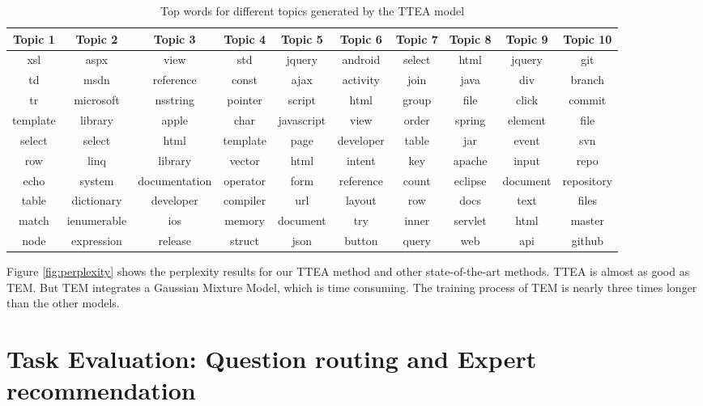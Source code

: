 {{{{{{{\begin{sidewaystable}
\caption{Top words for different topics generated by the TTEA model}
\label{tab:topwordsp}
\centering
\begin{tabular}{cccccccccc}
\hline
Topic 1& Topic 2& Topic 3& Topic 4 & Topic 5 & Topic 6& Topic 7 & Topic 8 &Topic 9 & Topic 10\\
\hline
xsl&aspx&view&std&jquery&android&select&html&jquery&git \\ 
td&msdn&reference&const&ajax&activity&join&java&div&branch \\ 
tr&microsoft&nsstring&pointer&script&html&group&file&click&commit \\ 
template&library&apple&char&javascript&view&order&spring&element&file \\ 
select&select&html&template&page&developer&table&jar&event&svn \\ 
row&linq&library&vector&html&intent&key&apache&input&repo \\ 
echo&system&documentation&operator&form&reference&count&eclipse&document&repository \\ 
table&dictionary&developer&compiler&url&layout&row&docs&text&files \\ 
match&ienumerable&ios&memory&document&try&inner&servlet&html&master \\ 
node&expression&release&struct&json&button&query&web&api&github \\ 
\hline
\end{tabular}
\end{sidewaystable}

Figure \ref{fig:perplexity} shows the perplexity results for our TTEA method and other state-of-the-art methods. 
TTEA is almost as good as TEM. But TEM integrates a Gaussian Mixture Model, which is time consuming. The training process of TEM is nearly three times longer than the other models.



\section{Task Evaluation: Question routing and Expert recommendation} 

}}}}}}}
